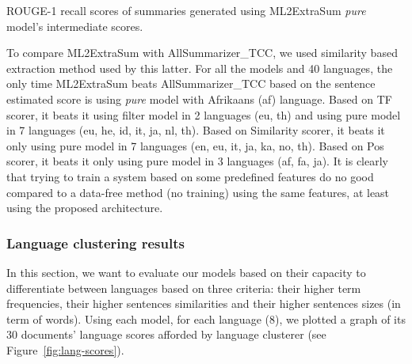 \begin{table}[ht]
	\centering
	\small
	\caption{ROUGE-1 recall scores of summaries generated using ML2ExtraSum \textit{pure} model's intermediate scores.}
	\label{tab:pure-inter-compare}
\end{table}

To compare ML2ExtraSum with AllSummarizer\_TCC, we used similarity based extraction method used by this latter. 
For all the models and 40 languages, the only time ML2ExtraSum beats AllSummarizer\_TCC based on the sentence estimated score is using \textit{pure} model with Afrikaans (af) language. 
Based on TF scorer, it beats it using filter model in 2 languages (eu, th) and using pure model in 7 languages (eu, he, id, it, ja, nl, th). 
Based on Similarity scorer, it beats it only using pure model in 7 languages (en, eu, it, ja, ka, no, th). 
Based on Pos scorer, it beats it only using pure model in 3 languages (af, fa, ja). 
It is clearly that trying to train a system based on some predefined features do no good compared to a data-free method (no training) using the same features, at least using the proposed architecture.  


\subsubsection{Language clustering results}

In this section, we want to evaluate our models based on their capacity to differentiate between languages based on three criteria: their higher term frequencies, their higher sentences similarities and their higher sentences sizes (in term of words).
Using each model, for each language (8), we plotted a graph of its 30 documents' language scores afforded by language clusterer (see Figure~\ref{fig:lang-scores}). 

